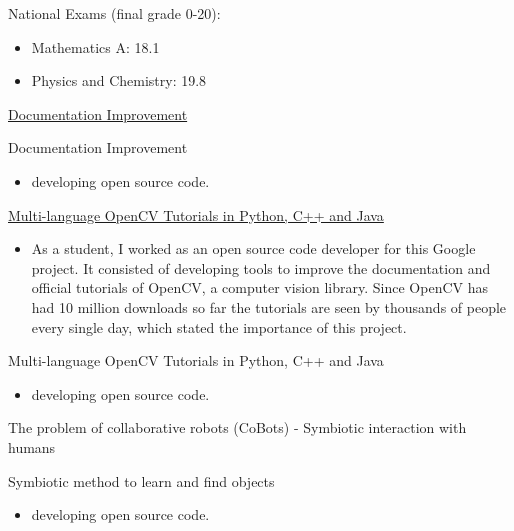 \documentclass{article}
\begin{document}
\begin{llist}
 
National Exams (final grade 0-20):
\begin{itemize}
\item[\textendash] Mathematics A: 18.1
\item[\textendash] Physics and Chemistry: 19.8
\end{itemize}

{
}
{
}
\vspace{-0.33cm}

{
\href{https://summerofcode.withgoogle.com/projects/\#6351260335734784}{Documentation Improvement}
}
{
Documentation Improvement
\vspace{-0.33cm}
\begin{itemize}
 \item developing open source code.
\end{itemize}
}

{
\href{https://summerofcode.withgoogle.com/archive/2016/projects/6414610965987328/}{Multi-language OpenCV Tutorials in Python, C++ and Java}
\vspace{-0.33cm}
\begin{itemize}
 \item[\textendash] As a student, I worked as an open source code developer for this Google project. It consisted of developing tools to improve the documentation and official tutorials of OpenCV, a computer vision library. Since OpenCV has had 10 million downloads so far the tutorials are seen by thousands of people every single day, which stated the importance of this project.
\end{itemize}
}
{
Multi-language OpenCV Tutorials in Python, C++ and Java
\vspace{-0.33cm}
\begin{itemize}
 \item developing open source code.
\end{itemize}
}

{
The problem of collaborative robots (CoBots) - Symbiotic interaction with humans
\vspace{-0.33cm}
}
{
Symbiotic method to learn and find objects
\vspace{-0.33cm}
\begin{itemize}
 \item developing open source code.
\end{itemize}
}


\end{llist}
\end{document}
